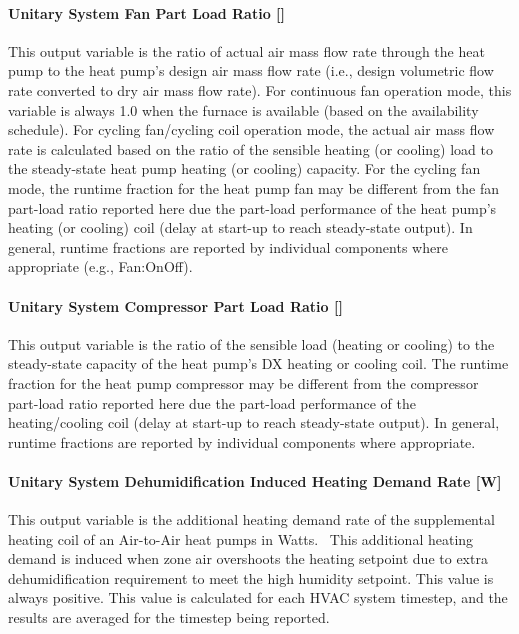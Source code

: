 \paragraph{\texorpdfstring{Unitary System Fan Part Load Ratio {[]}}{Unitary System Fan Part Load Ratio }}\label{unitary-system-fan-part-load-ratio-3}

This output variable is the ratio of actual air mass flow rate through the heat pump to the heat pump's design air mass flow rate (i.e., design volumetric flow rate converted to dry air mass flow rate). For continuous fan operation mode, this variable is always 1.0 when the furnace is available (based on the availability schedule). For cycling fan/cycling coil operation mode, the actual air mass flow rate is calculated based on the ratio of the sensible heating (or cooling) load to the steady-state heat pump heating (or cooling) capacity. For the cycling fan mode, the runtime fraction for the heat pump fan may be different from the fan part-load ratio reported here due the part-load performance of the heat pump's heating (or cooling) coil (delay at start-up to reach steady-state output). In general, runtime fractions are reported by individual components where appropriate (e.g., Fan:OnOff).

\paragraph{\texorpdfstring{Unitary System Compressor Part Load Ratio {[]}}{Unitary System Compressor Part Load Ratio }}\label{unitary-system-compressor-part-load-ratio-2}

This output variable is the ratio of the sensible load (heating or cooling) to the steady-state capacity of the heat pump's DX heating or cooling coil. The runtime fraction for the heat pump compressor may be different from the compressor part-load ratio reported here due the part-load performance of the heating/cooling coil (delay at start-up to reach steady-state output). In general, runtime fractions are reported by individual components where appropriate.

\paragraph{Unitary System Dehumidification Induced Heating Demand Rate {[}W{]}}\label{unitary-system-dehumidification-induced-heating-demand-rate-w}

This output variable is the additional heating demand rate of the supplemental heating coil of an Air-to-Air heat pumps in Watts.~ This additional heating demand is induced when zone air overshoots the heating setpoint due to extra dehumidification requirement to meet the high humidity setpoint. This value is always positive. This value is calculated for each HVAC system timestep, and the results are averaged for the timestep being reported.

